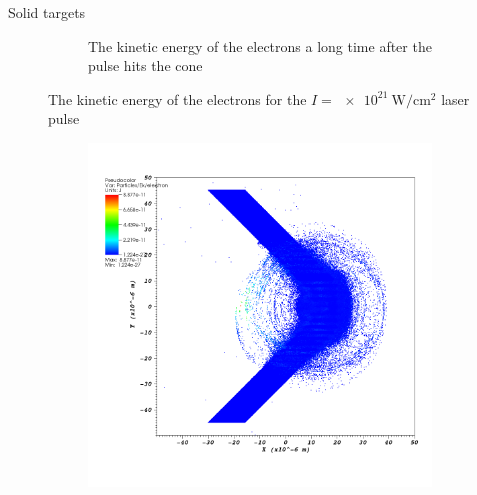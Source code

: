 \documentclass{beamer}
\begin{document}
\begin{frame}{Solid targets}
\begin{figure}[h]
\begin{subfigure}[b]{0.475\textwidth}
	    \caption{The kinetic energy of the electrons a long time after the pulse
	    hits the cone}%
	  \end{subfigure}
	  \caption{The kinetic energy of the electrons for the
	  \(I=\SI{e21}{\watt\per\centi\metre\squared}\) laser pulse}%
	\end{figure}
\end{frame}

\begin{frame}
	\begin{figure}[h]
	  \centering
	  \begin{subfigure}[b]{0.475\textwidth}
	    \centering
	    \includegraphics[width=\textwidth]{i22-ek-init-e}
	  \end{subfigure}
	  \hfill
	  \begin{subfigure}[b]{0.475\textwidth}
	    \centering

\end{subfigure}
\end{figure}
\end{frame}
\end{document}
